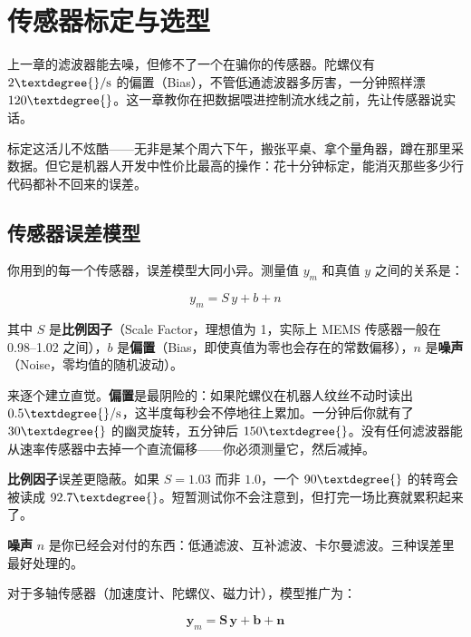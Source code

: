 \section{传感器标定与选型}

上一章的滤波器能去噪，但修不了一个在骗你的传感器。陀螺仪有 $2\textdegree{}/\mathrm{s}$ 的偏置（Bias），不管低通滤波器多厉害，一分钟照样漂 $120\textdegree{}$。这一章教你在把数据喂进控制流水线之前，先让传感器说实话。

标定这活儿不炫酷——无非是某个周六下午，搬张平桌、拿个量角器，蹲在那里采数据。但它是机器人开发中性价比最高的操作：花十分钟标定，能消灭那些多少行代码都补不回来的误差。

\subsection{传感器误差模型}

你用到的每一个传感器，误差模型大同小异。测量值 $y_m$ 和真值 $y$ 之间的关系是：

\begin{equation}
y_m = S \, y + b + n
\end{equation}

其中 $S$ 是\textbf{比例因子}（Scale Factor，理想值为 1，实际上 MEMS 传感器一般在 0.98--1.02 之间），$b$ 是\textbf{偏置}（Bias，即使真值为零也会存在的常数偏移），$n$ 是\textbf{噪声}（Noise，零均值的随机波动）。

来逐个建立直觉。\textbf{偏置}是最阴险的：如果陀螺仪在机器人纹丝不动时读出 $0.5\textdegree{}/\mathrm{s}$，这半度每秒会不停地往上累加。一分钟后你就有了 $30\textdegree{}$ 的幽灵旋转，五分钟后 $150\textdegree{}$。没有任何滤波器能从速率传感器中去掉一个直流偏移——你必须测量它，然后减掉。

\textbf{比例因子}误差更隐蔽。如果 $S = 1.03$ 而非 $1.0$，一个 $90\textdegree{}$ 的转弯会被读成 $92.7\textdegree{}$。短暂测试你不会注意到，但打完一场比赛就累积起来了。

\textbf{噪声} $n$ 是你已经会对付的东西：低通滤波、互补滤波、卡尔曼滤波。三种误差里最好处理的。

对于多轴传感器（加速度计、陀螺仪、磁力计），模型推广为：

\begin{equation}
\mathbf{y}_m = \mathbf{S} \, \mathbf{y} + \mathbf{b} + \mathbf{n}
\end{equation}

